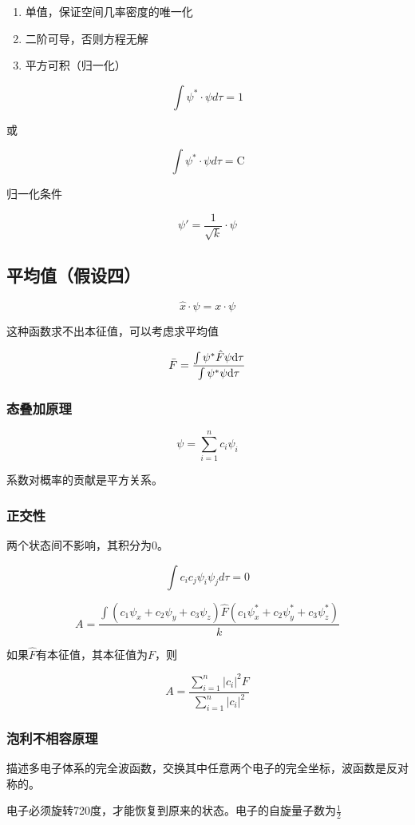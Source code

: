 \begin{enumerate}
    \item 单值，保证空间几率密度的唯一化
    \item 二阶可导，否则方程无解
    \item 平方可积（归一化）
\end{enumerate}

\[
    \int \psi^{*} \cdot \psi d\tau = 1  
\]

或

\[
    \int \psi^{*} \cdot \psi d\tau = \mathrm{C} 
\]

归一化条件

\[
    \psi' = \frac{1}{\sqrt{k}} \cdot \psi  
\]

\subsection{平均值（假设四）}

\[
    \hat{x} \cdot \psi = x \cdot \psi  
\]

这种函数求不出本征值，可以考虑求平均值

\[
    \bar{F} = \frac{\int \psi^* \hat{F} \psi \mathrm{d} \tau}{\int \psi^* \psi \mathrm{d} \tau}
\]

\subsubsection{态叠加原理}

\[
    \psi = \sum_{i=1}^n c_i \psi_i
\]

系数对概率的贡献是平方关系。


\subsubsection{正交性}

两个状态间不影响，其积分为0。

\[
   \int c_ic_j \psi_i \psi_j d\tau = 0
\]

\[
   A = \frac{\int (c_1 \psi_x + c_2 \psi_y + c_3 \psi_z) \hat{F} (c_1 \psi_x^* + c_2 \psi_y^* + c_3 \psi_z^*)}{k} 
\]

如果$\hat{F}$有本征值，其本征值为$F$，则

\[
    A = \frac{\sum\limits_{i=1}^n |c_i|^2 F }{ \sum\limits_{i=1}^n |c_i|^2 } 
\] 


\subsubsection{泡利不相容原理}

描述多电子体系的完全波函数，交换其中任意两个电子的完全坐标，波函数是反对称的。

电子必须旋转720度，才能恢复到原来的状态。电子的自旋量子数为$\frac{1}{2}$
